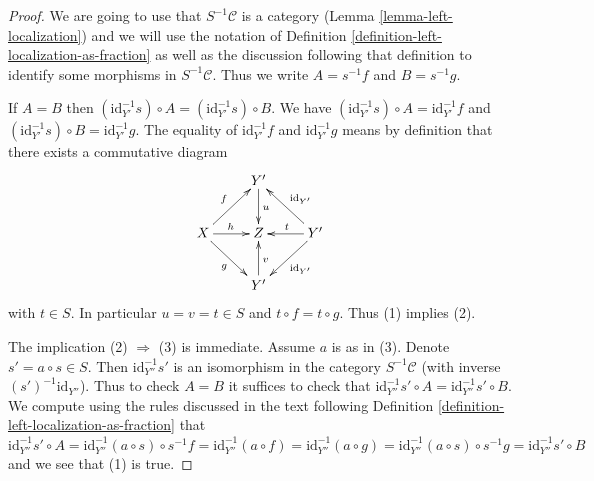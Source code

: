 \begin{proof}
We are going to use that $S^{-1}\mathcal{C}$ is a category
(Lemma \ref{lemma-left-localization}) and we will
use the notation of Definition \ref{definition-left-localization-as-fraction}
as well as the discussion following that definition to identify some
morphisms in $S^{-1}\mathcal{C}$. Thus we write $A = s^{-1}f$ and $B = s^{-1}g$.

\medskip\noindent
If $A = B$ then
$(\text{id}_{Y'}^{-1}s) \circ A = (\text{id}_{Y'}^{-1}s) \circ B$.
We have $(\text{id}_{Y'}^{-1}s) \circ A = \text{id}_{Y'}^{-1}f$
and $(\text{id}_{Y'}^{-1}s) \circ B = \text{id}_{Y'}^{-1}g$.
The equality of $\text{id}_{Y'}^{-1}f$ and $\text{id}_{Y'}^{-1}g$
means by definition that there exists a commutative diagram
$$
\xymatrix{
 & Y' \ar[d]^u & \\
X \ar[ru]^f \ar[r]^h \ar[rd]_g &
Z &
Y' \ar[lu]_{\text{id}_{Y'}} \ar[l]_t \ar[ld]^{\text{id}_{Y'}} \\
& Y' \ar[u]_v &
}
$$
with $t \in S$. In particular $u = v = t \in S$ and $t \circ f = t\circ g$.
Thus (1) implies (2).

\medskip\noindent
The implication (2) $\Rightarrow$ (3) is immediate. Assume $a$ is as in (3).
Denote $s' = a \circ s \in S$.
Then $\text{id}_{Y''}^{-1}s'$ is an isomorphism in the category
$S^{-1}\mathcal{C}$ (with inverse $(s')^{-1}\text{id}_{Y''}$).
Thus to check $A = B$ it suffices to check that
$\text{id}_{Y''}^{-1}s' \circ A = \text{id}_{Y''}^{-1}s' \circ B$.
We compute using the rules discussed in the text following
Definition \ref{definition-left-localization-as-fraction} that
$\text{id}_{Y''}^{-1}s' \circ A =
\text{id}_{Y''}^{-1}(a \circ s) \circ s^{-1}f =
\text{id}_{Y''}^{-1}(a \circ f) =
\text{id}_{Y''}^{-1}(a \circ g) =
\text{id}_{Y''}^{-1}(a \circ s) \circ s^{-1}g =
\text{id}_{Y''}^{-1}s' \circ B$ and we see that (1) is true.
\end{proof}

